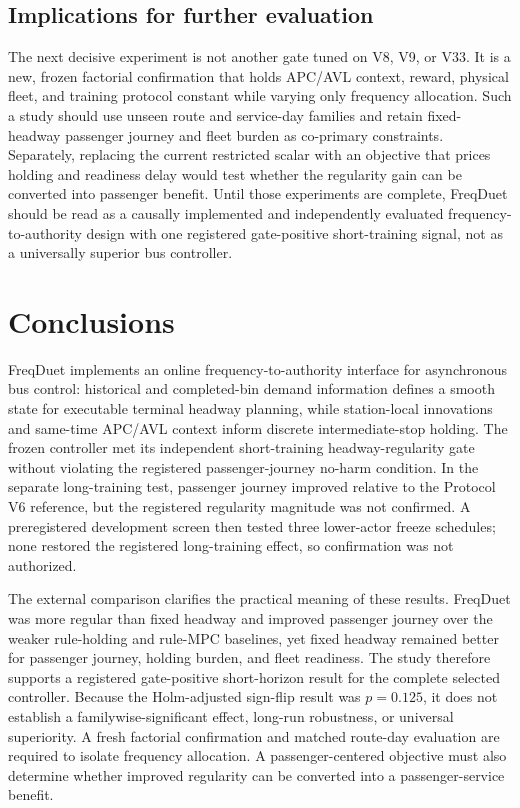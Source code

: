 \documentclass[preprint,12pt,authoryear,nopreprintline]{elsarticle}
\begin{document}
\subsection{Implications for further
evaluation}\label{implications-for-further-evaluation}

The next decisive experiment is not another gate tuned on V8, V9, or
V33. It is a new, frozen factorial confirmation that holds APC/AVL
context, reward, physical fleet, and training protocol constant while
varying only frequency allocation. Such a study should use unseen route
and service-day families and retain fixed-headway passenger journey and
fleet burden as co-primary constraints. Separately, replacing the
current restricted scalar with an objective that prices holding and
readiness delay would test whether the regularity gain can be converted
into passenger benefit. Until those experiments are complete, FreqDuet
should be read as a causally implemented and independently evaluated
frequency-to-authority design with one registered gate-positive
short-training signal, not as a universally superior bus controller.

\section{Conclusions}\label{conclusions}

FreqDuet implements an online frequency-to-authority interface for
asynchronous bus control: historical and completed-bin demand
information defines a smooth state for executable terminal headway
planning, while station-local innovations and same-time APC/AVL context
inform discrete intermediate-stop holding. The frozen controller met its
independent short-training headway-regularity gate without violating the
registered passenger-journey no-harm condition. In the separate
long-training test, passenger journey improved relative to the Protocol
V6 reference, but the registered regularity magnitude was not confirmed.
A preregistered development screen then tested three lower-actor freeze
schedules; none restored the registered long-training effect, so
confirmation was not authorized.

The external comparison clarifies the practical meaning of these
results. FreqDuet was more regular than fixed headway and improved
passenger journey over the weaker rule-holding and rule-MPC baselines,
yet fixed headway remained better for passenger journey, holding burden,
and fleet readiness. The study therefore supports a registered
gate-positive short-horizon result for the complete selected controller.
Because the Holm-adjusted sign-flip result was \(p=0.125\), it does not
establish a familywise-significant effect, long-run robustness, or
universal superiority. A fresh factorial confirmation and matched
route-day evaluation are required to isolate frequency allocation. A
passenger-centered objective must also determine whether improved
regularity can be converted into a passenger-service benefit.
\end{document}
